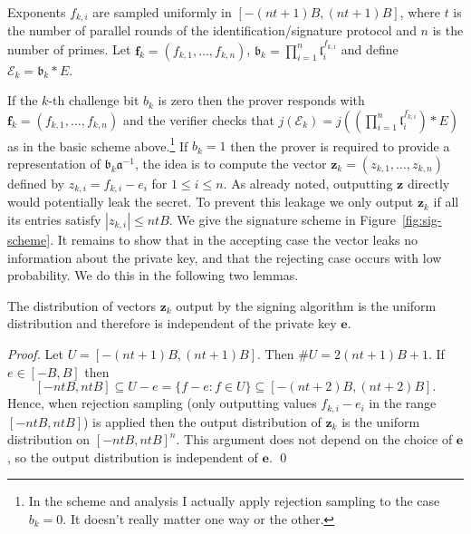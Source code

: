 \documentclass{llncs}
\newcommand{\E}{\mathcal{E}}
\renewcommand{\a}{\mathfrak{a}}
\renewcommand{\b}{\mathfrak{b}}
\renewcommand{\l}{\mathfrak{l}}
\newcommand{\e}{\mathbf{e}}
\newcommand{\f}{\mathbf{f}}
\newcommand{\z}{\mathbf{z}}
\begin{document}
Exponents $f_{k,i}$ are sampled uniformly in $[-(nt+1)B, (nt+1)B]$, where $t$ is the number of parallel rounds of the identification/signature protocol and $n$ is the number of primes.
Let $\f_k = (f_{k,1}, \dots, f_{k,n} )$, $\b_k = \prod_{i=1}^n \l_i^{f_{k,i}}$ and define $\E_k = \b_k * E $.


If the $k$-th challenge bit $b_k$ is zero then the prover responds with $\f_k = ( f_{k,1}, \dots, f_{k,n} )$ and the verifier checks that $j(\E_k) = j( (\prod_{i=1}^n \l_i^{f_{k,i}}) * E )$ as in the basic scheme above.\footnote{In the scheme and analysis I actually apply rejection sampling to the case $b_k = 0$. It doesn't really matter one way or the other.}
If $b_k = 1$ then the prover is required to provide a representation of $\b_k \a^{-1}$, the idea is to compute the vector $\z_k = (z_{k,1}, \dots, z_{k,n}) $ defined by $z_{k,i} = f_{k,i} - e_i $ for $1 \le i \le n$.
As already noted, outputting $\z$ directly would potentially leak the secret.
To prevent this leakage we only output $\z_k$ if all its entries satisfy $| z_{k,i} | \le nt B$.
We give the signature scheme in Figure~\ref{fig:sig-scheme}.
It remains to show that in the accepting case the vector leaks no information about the private key, and that the rejecting case occurs with low probability. We do this in the following two lemmas.

\begin{lemma} \label{lem:sim2}
The distribution of vectors $\z_k$ output by the signing algorithm is the uniform distribution and therefore is independent of the private key $\e$.
\end{lemma}

\begin{proof}
Let $U = [-(nt+1)B, (nt+1)B]$. Then $\#U = 2(nt + 1)B + 1$.
If $e \in [-B, B]$ then 
\[
    [-ntB, ntB] \subseteq  U - e = \{ f - e : f \in U \} \subseteq [-(nt+2)B, (nt+2)B ].
\]
Hence, when rejection sampling (only outputting values $f_{k,i} - e_i$ in the range $[-ntB, ntB]$) is applied then the output distribution of $\z_k$ is the uniform distribution on $[-ntB, ntB]^n$.
This argument does not depend on the choice of $\e$, so the output distribution is independent of $\e$. \qed
\end{proof}
\end{document}

